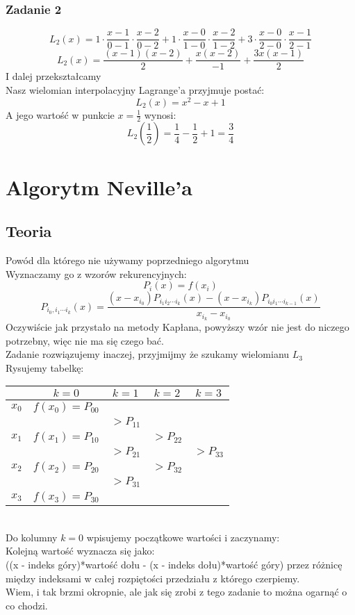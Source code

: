 \documentclass[a4paper]{article}
\begin{document}
\subsubsection*{Zadanie 2}

$$L_2(x) = 1\cdot \frac{x-1}{0-1}\cdot\frac{x-2}{0-2} + 1\cdot\frac{x-0}{1-0}\cdot\frac{x-2}{1-2} + 3\cdot\frac{x-0}{2-0}\cdot\frac{x-1}{2-1}$$
$$L_2(x) = \frac{(x-1)(x-2)}{2}+\frac{x(x-2)}{-1}+\frac{3x(x-1)}{2}$$
I dalej przekształcamy\\
Nasz wielomian interpolacyjny Lagrange'a przyjmuje postać:
$$L_2(x) = x^2-x+1$$
A jego wartość w punkcie $x=\frac{1}{2}$ wynosi:
$$L_2(\frac{1}{2}) = \frac{1}{4}-\frac{1}{2} + 1 = \frac{3}{4}$$

\section{Algorytm Neville'a}
\subsection{Teoria}
Powód dla którego nie używamy poprzedniego algorytmu\\
Wyznaczamy go z wzorów rekurencyjnych:
$$P_i(x) = f(x_i)$$
$$P_{i_0,i_1\cdots i_k}(x) = \frac{(x-x_{i_0})P_{i_1i_2\cdots i_k}(x) - (x-x_{i_k})P_{i_0i_1\cdots i_{k-1}}(x)}{x_{i_k}-x_{i_0}}$$
Oczywiście jak przystało na metody Kapłana, powyższy wzór nie jest do niczego potrzebny, więc nie ma się czego bać.\\
Zadanie rozwiązujemy inaczej, przyjmijmy że szukamy wielomianu $L_3$\\
Rysujemy tabelkę:\\
\begin{tabular}{|ccccc|}
\hline
&$k=0$&$k=1$&$k=2$&$k=3$\\
\hline
$x_0$&$f(x_0)=P_{00}$&&&\\
&&$\Big>P_{11}$&&\\
$x_1$&$f(x_1)=P_{10}$&&$\Big>P_{22}$&\\
&&$\Big>P_{21}$&&$\Big>P_{33}$\\
$x_2$&$f(x_2)=P_{20}$&&$\Big>P_{32}$&\\
&&$\Big>P_{31}$&&\\
$x_3$&$f(x_3)=P_{30}$&&&\\
\hline
\end{tabular}\\
Do kolumny $k=0$ wpisujemy początkowe wartości i zaczynamy:\\
Kolejną wartość wyznacza się jako: \\
((x - indeks góry)*wartość dołu - (x - indeks dołu)*wartość góry) przez różnicę między indeksami w całej rozpiętości przedziału z którego czerpiemy.\\
Wiem, i tak brzmi okropnie, ale jak się zrobi z tego zadanie to można ogarnąć o co chodzi.
\end{document}
